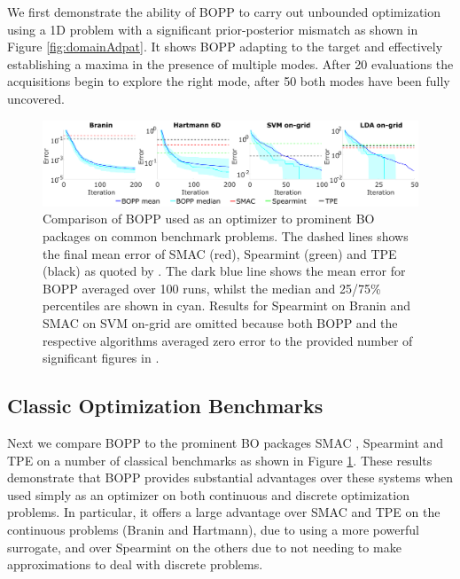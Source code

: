 We first demonstrate the ability of BOPP to carry out unbounded optimization using a 1D problem with a significant prior-posterior mismatch as shown in Figure \ref{fig:domainAdpat}.  It shows BOPP adapting to the target and effectively establishing a maxima in the presence of multiple modes.   After 20 evaluations the acquisitions begin to explore the right mode, after 50 both modes have been fully uncovered.

\begin{figure}[t]
	\centering
	\includegraphics[width=1\textwidth]{combined_opt_plots}
	\caption{Comparison of BOPP  used as an optimizer to prominent BO packages on common benchmark problems.  
		The dashed lines shows the final mean error of SMAC (red), Spearmint (green) and TPE (black) as quoted by \cite{eggensperger2013towards}. %
		The dark blue line shows the mean error for BOPP averaged over 100 runs, whilst the median and 25/75\% percentiles are shown in cyan. Results for Spearmint on Branin and SMAC on SVM on-grid are omitted because both BOPP and the respective algorithms averaged zero error to the provided number of significant figures in \cite{eggensperger2013towards}.
		\label{fig:bayes-opt}}
	\vspace{5pt}
\end{figure}

\subsection{Classic Optimization Benchmarks}

Next we compare BOPP to the prominent BO packages SMAC \cite{hutter2011sequential}, Spearmint \cite{snoek2012practical} and TPE \cite{bergstra2011algorithms} on a number of classical benchmarks as shown in Figure \ref{fig:bayes-opt}.  These results demonstrate that BOPP provides substantial advantages over these systems when used simply as an optimizer on both continuous and discrete optimization problems.  In particular, it offers a large advantage over SMAC and TPE on the continuous problems (Branin and Hartmann), due to using a more powerful surrogate, and over Spearmint on the others due to not needing to make approximations to deal with discrete problems.

